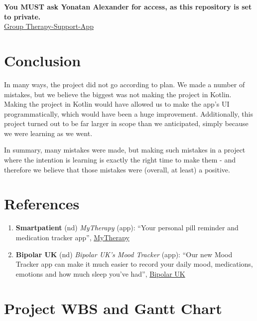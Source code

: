 \documentclass[11pt]{article}
\begin{document}
    \textbf{You MUST ask Yonatan Alexander for access, as this repository is set to private.}\\

    \href{https://github.com/Jon-AL/4471---Therapy-Support-App}{Group Therapy-Support-App}


    \section{Conclusion}\label{sec:conclusion}

    In many ways, the project did not go according to plan.
    We made a number of mistakes, but we believe the biggest was not making the project in Kotlin.
    Making the project in Kotlin would have allowed us to make the app's UI programmatically, which would have been a huge improvement.
    Additionally, this project turned out to be far larger in scope than we anticipated, simply because we were learning as we went.

    In summary, many mistakes were made, but making such mistakes in a project where the intention is learning is exactly the right time to make them - and therefore we believe that those mistakes were (overall, at least) a positive.

    \pagebreak


    \section{References}\label{sec:reference}

    \begin{enumerate}
        [label=\[\arabic*\]]
        \item \textbf{Smartpatient} (nd) \textsl{MyTherapy} (app): ``Your personal pill reminder and medication tracker app'', \href{www.mytherapyapp.com}{MyTherapy}

        \item \textbf{Bipolar UK} (nd) \textsl{Bipolar UK’s Mood Tracker} (app): ``Our new Mood Tracker app can make it much easier to record your daily mood, medications, emotions and how much sleep you’ve had'', \href{https://www.bipolaruk.org/blog/track-your-mood-app}{Bipolar UK}

    \end{enumerate}


    \pagebreak


    \appendix

    \appendixpage


    \section{Project WBS and Gantt Chart}\label{sec:project-wbs}
\end{document}
